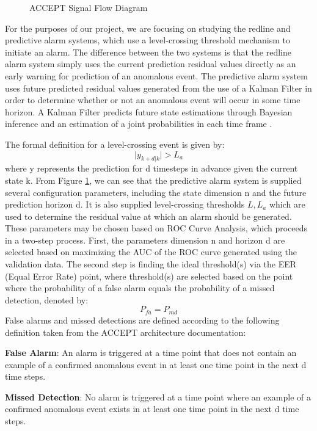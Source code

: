 \documentclass{acm_proc_article-sp}
\begin{document}
\begin{figure}[!h]
\centering
{}
\caption{ACCEPT Signal Flow Diagram}
\label{fig:accept-signal}
\end{figure}

For the purposes of our project, we are focusing on studying the redline and predictive alarm systems, which use a level-crossing threshold mechanism to initiate an alarm. The difference between the two systems is that the redline alarm system simply uses the current prediction residual values directly as an early warning for prediction of an anomalous event. The predictive alarm system uses future predicted residual values generated from the use of a Kalman Filter in order to determine whether or not an anomalous event will occur in some time horizon. A Kalman Filter predicts future state estimations through Bayesian inference and an estimation of a joint probabilities in each time frame \cite{Kalman}. 

The formal definition for a level-crossing event is given by: \[\mid y_{k+d|k} \mid  > L_a\] where y represents the prediction for d timesteps in advance given the current state k. From Figure \ref{fig:accept-signal}, we can see that the predictive alarm system is supplied several configuration parameters, including the state dimension n and the future prediction horizon d. It is also supplied level-crossing thresholds \begin{math}L, L_a\end{math} which are used to determine the residual value at which an alarm should be generated. These parameters may be chosen based on ROC Curve Analysis, which proceeds in a two-step process. First, the parameters dimension n and horizon d are selected based on maximizing the AUC of the ROC curve generated using the validation data. The second step is finding the ideal threshold(s) via the EER (Equal Error Rate) point, where threshold(s) are selected based on the point where the probability of a false alarm equals the probability of a missed detection, denoted by: \[P_{fa}=P_{md}\] False alarms and missed detections are defined according to the following definition taken from the ACCEPT architecture documentation:

\textbf{False Alarm}: An alarm is triggered at a time point that does not contain an example of a confirmed anomalous event in at least one time point in the next d time steps.

\textbf{Missed Detection}: No alarm is triggered at a time point where an example of a confirmed anomalous event exists in at least one time point in the next d time steps.
\end{document}
